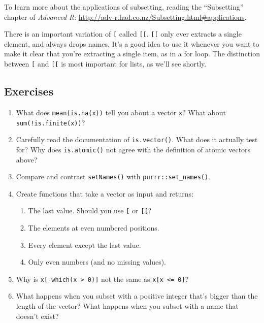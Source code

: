 \documentclass[]{book}
\begin{document}
To learn more about the applications of subsetting, reading the
``Subsetting'' chapter of \emph{Advanced R}:
\url{http://adv-r.had.co.nz/Subsetting.html\#applications}.

There is an important variation of \texttt{{[}} called \texttt{{[}{[}}.
\texttt{{[}{[}} only ever extracts a single element, and always drops
names. It's a good idea to use it whenever you want to make it clear
that you're extracting a single item, as in a for loop. The distinction
between \texttt{{[}} and \texttt{{[}{[}} is most important for lists, as
we'll see shortly.

\subsection{Exercises}\label{exercises-52}

\begin{enumerate}
\def\labelenumi{\arabic{enumi}.}
\item
  What does \texttt{mean(is.na(x))} tell you about a vector \texttt{x}?
  What about \texttt{sum(!is.finite(x))}?
\item
  Carefully read the documentation of \texttt{is.vector()}. What does it
  actually test for? Why does \texttt{is.atomic()} not agree with the
  definition of atomic vectors above?
\item
  Compare and contrast \texttt{setNames()} with
  \texttt{purrr::set\_names()}.
\item
  Create functions that take a vector as input and returns:

  \begin{enumerate}
  \def\labelenumii{\arabic{enumii}.}
  \item
    The last value. Should you use \texttt{{[}} or \texttt{{[}{[}}?
  \item
    The elements at even numbered positions.
  \item
    Every element except the last value.
  \item
    Only even numbers (and no missing values).
  \end{enumerate}
\item
  Why is \texttt{x{[}-which(x\ \textgreater{}\ 0){]}} not the same as
  \texttt{x{[}x\ \textless{}=\ 0{]}}?
\item
  What happens when you subset with a positive integer that's bigger
  than the length of the vector? What happens when you subset with a
  name that doesn't exist?
\end{enumerate}
\end{document}
